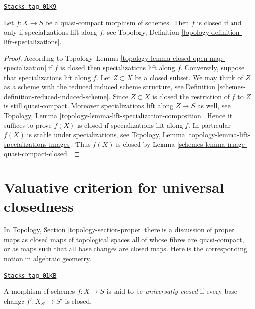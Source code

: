 \begin{lemma}
\label{schemes-lemma-quasi-compact-closed}
\href{https://stacks.math.columbia.edu/tag/01K9}{\texttt{Stacks tag 01K9}}

Let $f : X \to S$ be a quasi-compact morphism of schemes.
Then $f$ is closed if and only if specializations lift
along $f$, see
Topology, Definition \ref{topology-definition-lift-specializations}.
\end{lemma}

\begin{proof}

According to
Topology, Lemma \ref{topology-lemma-closed-open-map-specialization}
if $f$ is closed then specializations lift along $f$.
Conversely, suppose that specializations lift along $f$.
Let $Z \subset X$ be a closed subset. We may think of $Z$
as a scheme with the reduced induced scheme structure, see
Definition \ref{schemes-definition-reduced-induced-scheme}.
Since $Z \subset X$ is closed the restriction
of $f$ to $Z$ is still quasi-compact. Moreover specializations lift
along $Z \to S$ as well,
see Topology, Lemma \ref{topology-lemma-lift-specialization-composition}.
Hence it suffices to prove $f(X)$ is closed if specializations lift along $f$.
In particular $f(X)$ is stable under specializations, see
Topology, Lemma \ref{topology-lemma-lift-specializations-images}.
Thus $f(X)$ is closed by
Lemma \ref{schemes-lemma-image-quasi-compact-closed}.
\end{proof}

\section{Valuative criterion for universal closedness}
\label{schemes-section-valuative-criterion-universal-closedness}
In Topology, Section \ref{topology-section-proper} there is a
discussion of proper maps as closed maps of topological spaces
all of whose fibres are quasi-compact, or as maps such that
all base changes are closed maps. Here is the corresponding notion
in algebraic geometry.

\begin{definition}
\label{schemes-definition-universally-closed}
\href{https://stacks.math.columbia.edu/tag/01KB}{\texttt{Stacks tag 01KB}}

A morphism of schemes $f : X \to S$ is said to be
{\it universally closed} if every base change
$f' : X_{S'} \to S'$ is closed.
\end{definition}

